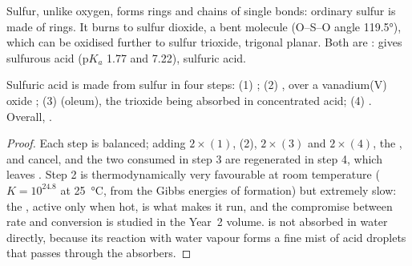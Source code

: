 Sulfur, unlike oxygen, forms rings and chains of single  bonds:
ordinary sulfur is made of  rings. It burns to sulfur dioxide, a
bent molecule (O--S--O angle \ang{119.5}), which can be oxidised further
to sulfur trioxide, trigonal planar. Both are : 
gives sulfurous acid ($\mathrm{p}K_a$ 1.77 and 7.22),  sulfuric
acid.

\begin{proposition}\label{prop:b1:p-block-16-18:contact-steps}
Sulfuric acid is made from sulfur in four steps:
(1) ; (2) , over a vanadium(V)
oxide ; (3)  (oleum), the trioxide being
absorbed in concentrated acid; (4) . Overall,
.
\end{proposition}

\begin{proof}
Each step is balanced; adding $2\times(1)$, (2), $2\times(3)$ and
$2\times(4)$, the ,  and  cancel, and the two
 consumed in step 3 are regenerated in step 4, which leaves
. Step 2 is thermodynamically very
favourable at room temperature ($K = 10^{24.8}$ at \qty{25}{\celsius}, from
the Gibbs energies of formation) but extremely slow: the , active
only when hot, is what makes it run, and the compromise between rate and
conversion is studied in the Year~2 volume.  is not absorbed in
water directly, because its reaction with water vapour forms a fine mist
of acid droplets that passes through the absorbers.
\end{proof}

